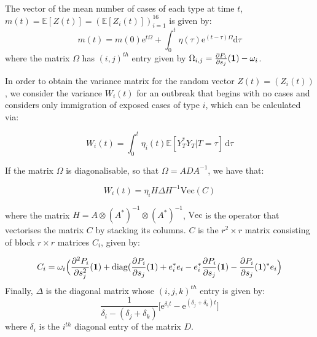 \documentclass{article}
\begin{document}
The vector of the mean number of cases of each type at time $t$, $m(t) = {\mathbb{E}}[Z(t)] = ({\mathbb{E}}[Z_i(t)])_{i=1}^{16}$ is given by:
\begin{equation}
m(t) = m(0){\mathrm{e}}^{t\Omega} + \int_0^t \eta(\tau){\mathrm{e}}^{(t-\tau)\Omega} {\mathrm{d}}\tau 
\end{equation}
where the matrix $\Omega$ has $(i, j)^{th}$ entry given by $\Omega_{i, j} = \frac{\partial P_i}{\partial s_j}({\vb{1}}) - \omega_i$. 





 
In order to obtain the variance matrix for the random vector $Z(t) = (Z_i(t))$, we consider the variance $W_i(t)$ for an outbreak that begins with no cases and considers only immigration of exposed cases of type $i$, which can be calculated via:

\begin{equation}
W_i(t) = \int_0^t \eta_i(t) {\mathbb{E}}[Y_T^*Y_T | T=\tau] \, {\mathrm{d}}\tau
\end{equation}

If the matrix $\Omega$ is diagonalisable, so that $\Omega = ADA^{-1}$, we have that:

\begin{equation}
W_i(t) = \eta_i H\Delta H^{-1} {\mathrm{Vec}}(C)
\end{equation}
 
where the matrix $H= A \otimes (A^*)^{-1} \otimes (A^*)^{-1}$, ${\mathrm{Vec}}$ is the operator that vectorises the matrix $C$ by stacking its columns. $C$ is the $r^2 \times r$ matrix consisting of block $r \times r$ matrices $C_i$, given by:

\begin{equation}
C_i = \omega_i\Big(\frac{\partial^2 P_i}{\partial s_j^2}({\vb{1}}) + {\mathrm{diag}}(\frac{\partial P_i}{\partial s_j}({\vb{1}}) + e_i^*e_i - e_i^* \frac{\partial P_i}{\partial s_j}({\vb{1}}) - \frac{\partial P_i}{\partial s_j}({\vb{1}})^*e_i\Big)
\end{equation}
Finally, $\Delta$ is the diagonal matrix whose $(i, j, k)^{th}$ entry is given by:
\begin{equation}
\frac{1}{\delta_i - (\delta_j + \delta_k)}\big[{\mathrm{e}}^{\delta_i t} - {\mathrm{e}}^{(\delta_j + \delta_k) t}\big] 
\end{equation}
where $\delta_i$ is the $i^{th}$ diagonal entry of the matrix $D$. 
\end{document}
